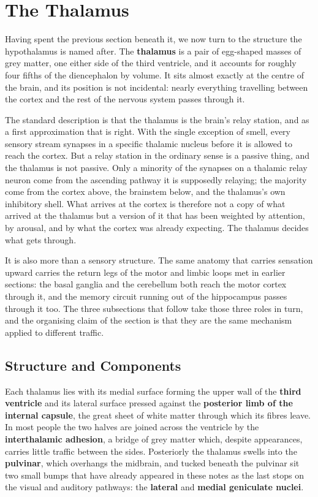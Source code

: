 \documentclass[11pt]{article}
\begin{document}
\section{The Thalamus}

Having spent the previous section beneath it, we now turn to the structure the hypothalamus is named after. The \textbf{thalamus} is a pair of egg-shaped masses of grey matter, one either side of the third ventricle, and it accounts for roughly four fifths of the diencephalon by volume. It sits almost exactly at the centre of the brain, and its position is not incidental: nearly everything travelling between the cortex and the rest of the nervous system passes through it.

The standard description is that the thalamus is the brain's relay station, and as a first approximation that is right. With the single exception of smell, every sensory stream synapses in a specific thalamic nucleus before it is allowed to reach the cortex. But a relay station in the ordinary sense is a passive thing, and the thalamus is not passive. Only a minority of the synapses on a thalamic relay neuron come from the ascending pathway it is supposedly relaying; the majority come from the cortex above, the brainstem below, and the thalamus's own inhibitory shell. What arrives at the cortex is therefore not a copy of what arrived at the thalamus but a version of it that has been weighted by attention, by arousal, and by what the cortex was already expecting. The thalamus decides what gets through.

It is also more than a sensory structure. The same anatomy that carries sensation upward carries the return legs of the motor and limbic loops met in earlier sections: the basal ganglia and the cerebellum both reach the motor cortex through it, and the memory circuit running out of the hippocampus passes through it too. The three subsections that follow take those three roles in turn, and the organising claim of the section is that they are the same mechanism applied to different traffic.

\subsection{Structure and Components}

Each thalamus lies with its medial surface forming the upper wall of the \textbf{third ventricle} and its lateral surface pressed against the \textbf{posterior limb of the internal capsule}, the great sheet of white matter through which its fibres leave. In most people the two halves are joined across the ventricle by the \textbf{interthalamic adhesion}, a bridge of grey matter which, despite appearances, carries little traffic between the sides. Posteriorly the thalamus swells into the \textbf{pulvinar}, which overhangs the midbrain, and tucked beneath the pulvinar sit two small bumps that have already appeared in these notes as the last stops on the visual and auditory pathways: the \textbf{lateral} and \textbf{medial geniculate nuclei}.
\end{document}
